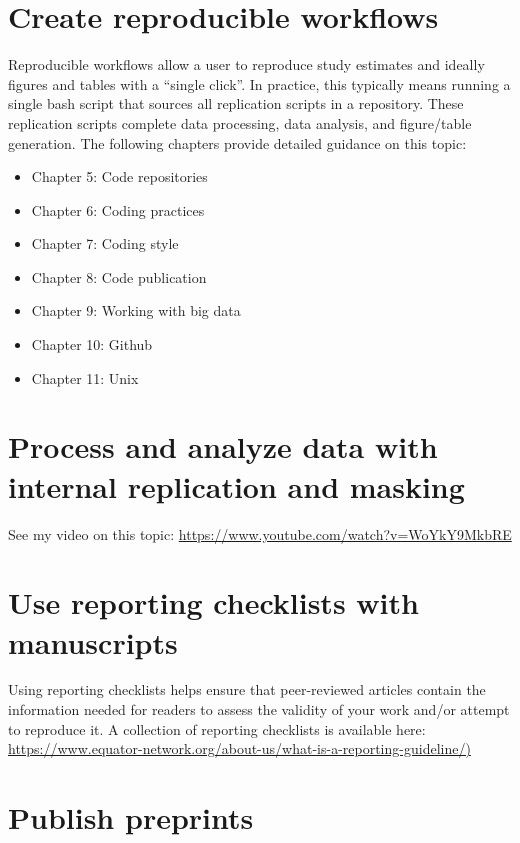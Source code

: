 \documentclass[
]{book}
\providecommand{\tightlist}{%
  \setlength{\itemsep}{0pt}\setlength{\parskip}{0pt}}
\begin{document}
\section{Create reproducible workflows}\label{create-reproducible-workflows}

Reproducible workflows allow a user to reproduce study estimates and ideally figures and tables with a ``single click''. In practice, this typically means running a single bash script that sources all replication scripts in a repository. These replication scripts complete data processing, data analysis, and figure/table generation. The following chapters provide detailed guidance on this topic:

\begin{itemize}
\tightlist
\item
  Chapter 5: Code repositories
\item
  Chapter 6: Coding practices
\item
  Chapter 7: Coding style
\item
  Chapter 8: Code publication
\item
  Chapter 9: Working with big data
\item
  Chapter 10: Github
\item
  Chapter 11: Unix
\end{itemize}

\section{Process and analyze data with internal replication and masking}\label{process-and-analyze-data-with-internal-replication-and-masking}

See my video on this topic: \url{https://www.youtube.com/watch?v=WoYkY9MkbRE}

\section{Use reporting checklists with manuscripts}\label{use-reporting-checklists-with-manuscripts}

Using reporting checklists helps ensure that peer-reviewed articles contain the information needed for readers to assess the validity of your work and/or attempt to reproduce it. A collection of reporting checklists is available here: \href{https://www.equator-network.org/about-us/what-is-a-reporting-guideline/}{https://www.equator-network.org/about-us/what-is-a-reporting-guideline/)}

\section{Publish preprints}\label{publish-preprints}
\end{document}
